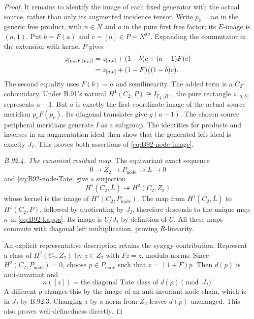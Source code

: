 \begin{proof}
It remains to identify the image of each fixed generator with the
actual source, rather than only its augmented incidence tensor.
Write $p_\nu=n a$ in the generic free product, with $n\in N$
and $a$ in the pure first free factor; its $E$-image is $(a,1)$.
Put $b=F(a)$ and $c=[n]\in P=N^{\mathrm{ab}}$.
Expanding the commutator in the extension with kernel $P$ gives
\begin{align}
 z_{[p_\nu,F(p_\nu)]}
  &=z_{[a,b]}+(1-b)c+(a-1)F(c) \notag\\
  &=z_{[a,b]}+(1-F)\bigl((1-b)c\bigr).
                                                        \label{eq:B92-node-coboundary}
\end{align}
The second equality uses $F(b)=a$ and semilinearity.
The added term is a $C_2$-coboundary. Under B.91's natural
$H^1(C_2,P)\cong I_{\mathbb F_2[R]}$, the pure rectangle
$z_{[a,b]}$ represents $a-1$. But $a$ is exactly the
first-coordinate image of the actual source meridian
$p_\nu F(p_\nu)$. Its diagonal translates give $g(a-1)$.
The chosen source peripheral meridians generate $I$ as a subgroup.
The identities for products and inverses in an augmentation ideal
then show that the generated left ideal is exactly $J_I$.
This proves both assertions of \eqref{eq:B92-node-image}.

\emph{B.92.4. The canonical residual map.}
The equivariant exact sequence
\[
 0\longrightarrow Z_2\longrightarrow P_{\mathrm{node}}
                \longrightarrow\overline L\longrightarrow0
\]
and \eqref{eq:B92-node-Tate} give a surjection
\[
 H^1(C_2,\overline L)\twoheadrightarrow H^2(C_2,Z_2)
\]
whose kernel is the image of $H^1(C_2,P_{\mathrm{node}})$.
The map from $H^1(C_2,\overline L)$ to $H^1(C_2,P)$, followed
by quotienting by $J_I$, therefore descends to the unique map
$\kappa$ in \eqref{eq:B92-kappa}. Its image is $U/J_I$ by
definition of $U$. All these maps commute with diagonal left
multiplication, proving $R$-linearity.

An explicit representative description retains the syzygy contribution.
Represent a class of $H^2(C_2,Z_2)$ by $z\in Z_2$ with $Fz=z$,
modulo norms. Since $H^2(C_2,P_{\mathrm{node}})=0$, choose
$p\in P_{\mathrm{node}}$ such that $z=(1+F)p$. Then $d(p)$
is anti-invariant and
\[
 \kappa([z])=
  \text{the diagonal Tate class of }d(p)\pmod{J_I}.
\]
A different $p$ changes this by the image of an anti-invariant
node chain, which is in $J_I$ by B.92.3. Changing $z$ by a norm
from $Z_2$ leaves $d(p)$ unchanged. This also proves
well-definedness directly.


\end{proof}

